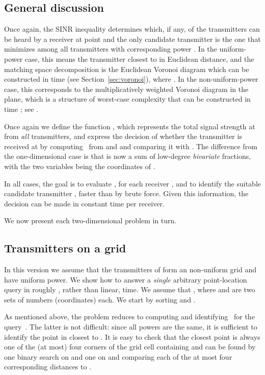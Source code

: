 \documentclass[11pt]{article}
\theoremstyle{remark}
\begin{document}
\subsection{General discussion}
Once again, the SINR inequality determines which, if any, of the transmitters 
 can be heard by a receiver at point  and the only
candidate transmitter  is the one that minimizes
 among all transmitters  with corresponding
power .  In the uniform-power case, this means the transmitter
closest to  in Euclidean distance, and the matching space
decomposition is the Euclidean Voronoi diagram which can be
constructed in  time (see Section~\ref{sec:voronoi}),
where .  In the non-uniform-power case, this corresponds to
the multiplicatively weighted Voronoi diagram in the plane, which is a
structure of worst-case complexity  that can be
constructed in time ; see \cite{ae-oacwvdp-84}.

Once again we define the function , which represents the total signal strength
at  from \emph{all} transmitters, and express the decision of whether
the transmitter  is received at  by computing~ from  and  and comparing
it with .  The difference from the one-dimensional case is that
 is now a sum of low-degree \emph{bivariate} fractions, with
the two variables being the coordinates of . 

In all cases, the goal is to evaluate , for each receiver , and
to identify the suitable candidate transmitter ,
faster than by brute force.  Given this information, the
decision can be made in constant time per receiver.

We now present each two-dimensional problem in turn.

\subsection{Transmitters on a grid}
\label{sec:trans-grid}



In this version we assume that the transmitters of  form an 
non-uniform grid and have uniform power.  We show how to answer a \emph{single}
arbitrary point-location query in roughly , rather than linear,
time.
We assume that , where  and  are two sets of 
numbers (coordinates) each.  We start by sorting  and .  

As mentioned above, the problem reduces to computing  and
identifying~ for the query~.  The latter is not
difficult: since all powers are the same, it is
sufficient to identify the point in  closest to .  It is
easy to check that the closest point is always one of the (at most) four
corners of the grid cell containing  and can be found by one binary search on
 and one on  and comparing each of the at most four corresponding
distances to . 
\end{document}
